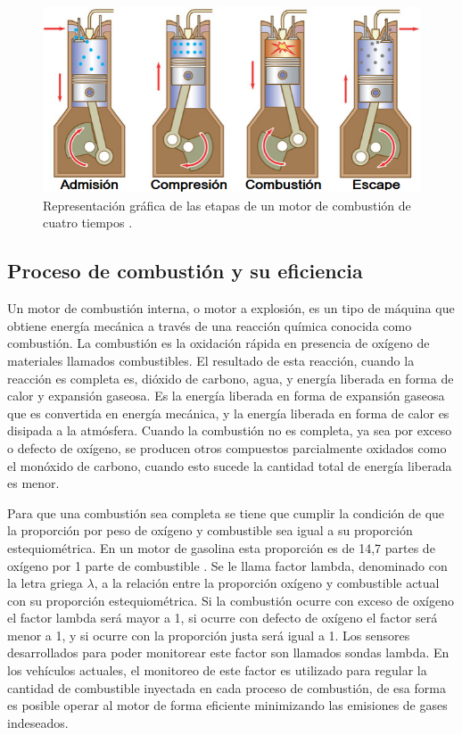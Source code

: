 \begin{figure}[htpb]
\centering
\includegraphics[width=.9\textwidth]{./Figures/motor-combustion.png}
\caption{Representación gráfica de las etapas de un motor de combustión de cuatro tiempos \protect\footnotemark[3].}
\label{fig:motor-combustion}
\end{figure}

\subsection{Proceso de combustión y su eficiencia}

Un motor de combustión interna, o motor a explosión, es un tipo de máquina que obtiene energía mecánica a través de una reacción química conocida como combustión. La combustión es la oxidación rápida en presencia de oxígeno de materiales llamados combustibles. El resultado de esta reacción, cuando la reacción es completa es, dióxido de carbono, agua, y energía liberada en forma de calor y expansión gaseosa. Es la energía liberada en forma de expansión gaseosa que es convertida en energía mecánica, y la energía liberada en forma de calor es disipada a la atmósfera. Cuando la combustión no es completa, ya sea por exceso o defecto de oxígeno, se producen otros compuestos parcialmente oxidados como el monóxido de carbono, cuando esto sucede la cantidad total de energía liberada es menor.

Para que una combustión sea completa se tiene que cumplir la condición de que la proporción por peso de oxígeno y combustible sea igual a su proporción estequiométrica. En un motor de gasolina esta proporción es de 14,7 partes de oxígeno por 1 parte de combustible \citep{book-afr}. Se le llama factor lambda, denominado con la letra griega $\lambda$, a la relación entre la proporción oxígeno y combustible actual con su proporción estequiométrica. Si la combustión ocurre con exceso de oxígeno el factor lambda será mayor a 1, si ocurre con defecto de oxígeno el factor será menor a 1, y si ocurre con la proporción justa será igual a 1. Los sensores desarrollados para poder monitorear este factor son llamados sondas lambda. En los vehículos actuales, el monitoreo de este factor es utilizado para regular la cantidad de combustible inyectada en cada proceso de combustión, de esa forma es posible operar al motor de forma eficiente minimizando las emisiones de gases indeseados.

